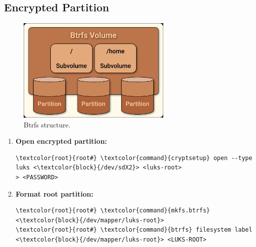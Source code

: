 \documentclass[10pt, a4paper, onecolumn, oneside, titlepage, openany]{book}
\begin{document}
\subsection{Encrypted Partition}
\begin{figure}[ht]
    \begin{center}
        \includegraphics[width=75mm]{./src/img/btrfs.png}
        \caption{Btrfs structure.}
        \label{fig:2}
    \end{center}
\end{figure}
\begin{enumerate}
    \item \textbf{Open encrypted partition:}
\begin{Verbatim}[commandchars=\\\{\}]
\textcolor{root}{root#} \textcolor{command}{cryptsetup} open --type luks <\textcolor{block}{/dev/sdX2}> <luks-root>
> <PASSWORD>
\end{Verbatim}
    \item \textbf{Format root partition:}
\begin{Verbatim}[commandchars=\\\{\}]
\textcolor{root}{root#} \textcolor{command}{mkfs.btrfs} <\textcolor{block}{/dev/mapper/luks-root}>
\textcolor{root}{root#} \textcolor{command}{btrfs} filesystem label <\textcolor{block}{/dev/mapper/luks-root}> <LUKS-ROOT>
\end{Verbatim}
\end{enumerate}
\end{document}
